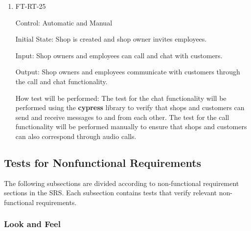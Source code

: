 \documentclass[12pt, titlepage]{article}
\begin{document}
\begin{enumerate}
    \item{FT-RT-25\\}

Control: Automatic and Manual

Initial State: Shop is created and shop owner invites employees.

Input: Shop owners and employees can call and chat with customers.

Output: Shop owners and employees communicate with customers through the call and chat functionality.

How test will be performed: The test for the chat functionality will be performed using the \textbf{cypress} library to verify that shops and customers can send and receive messages to and from each other. The test for the call functionality will be performed manually to ensure that shops and customers can also correspond through audio calls.
\end{enumerate}

\subsection{Tests for Nonfunctional Requirements}




The following subsections are divided according to non-functional requirement sections in the SRS. Each subsection contains tests that verify relevant non-functional requirements.

\subsubsection{Look and Feel}
		
\end{document}
